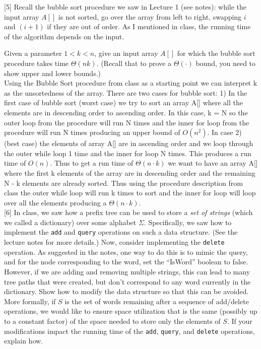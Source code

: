 \documentclass[addpoints, 11pt]{exam}
\begin{document}
\begin{questions}
[5]
Recall the bubble sort procedure we saw in Lecture 1 (see notes): while the input array $A[]$ is not sorted, go over the array from left to right, swapping $i$ and $(i+1)$ if they are out of order. As I mentioned in class, the running time of the algorithm depends on the input. 

Given a parameter $1< k < n$, give an input array $A[]$ for which the bubble sort procedure takes time $\Theta(nk)$.  (Recall that to prove a $\Theta(\cdot)$ bound, you need to show upper and lower bounds.) \\

Using the Bubble Sort procedure from class as a starting point we can interpret k as the unsortedness of the array. There are two cases for bubble sort: 1) In the first case of bubble sort (worst case)
we try to sort an array A[] where all the elements are in descending order to ascending order. In this case, k = N so the outer loop from the procedure will run N times and the inner for loop from the procedure
will run N times producing an upper bound of $O(n^{2})$. In case 2) (best case) the elements of array A[] are in ascending order and we loop through the outer while loop 1 time and the inner for loop N times. This produces
a run time of $O(n)$. Thus to get a run time of $\Theta(n \cdot k)$ we want to have an array A[] where the first k elements of the array are in descending order and the remaining N - k elements are already sorted.
Thus using the procedure description from class the outer while loop will run k times to sort and the inner for loop will loop over all the elements producing a $\Theta{(n \cdot k)}$. \\

[6]
In class, we saw how a prefix tree can be used to store a {\em set of strings} (which we called a dictionary) over some alphabet $\Sigma$. Specifically, we saw how to implement the \texttt{add} and \texttt{query} operations on such a data structure. (See the lecture notes for more details.) Now, consider implementing the \texttt{delete} operation. As suggested in the notes, one way to do this is to mimic the 
query, and for the node corresponding to the word, set the ``IsWord'' boolean to false. However, if we are adding and removing multiple strings, this can lead to many tree paths that were created, but don't correspond to any word currently in the dictionary. 
Show how to modify the data structure so that this can be avoided. More formally, if $S$ is the set of words remaining after a sequence of add/delete operations, we would like to ensure space utilization that is the same (possibly up to a constant factor) of the space needed to store only the elements of $S$. If your modifications impact the running time of the \texttt{add}, \texttt{query}, and \texttt{delete} operations, explain how. \\


\end{questions}
\end{document}
